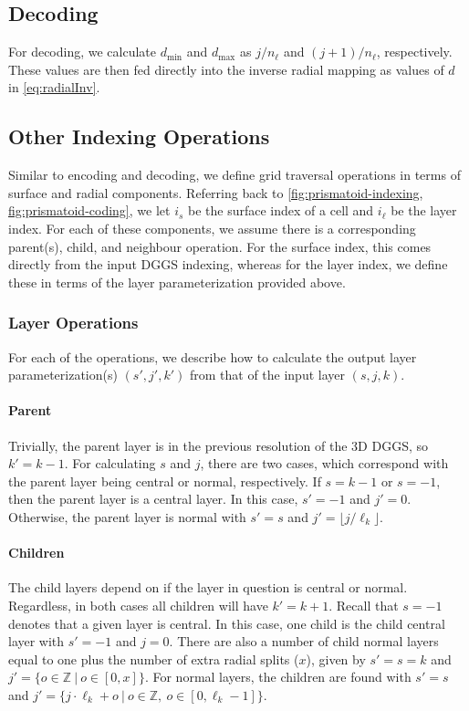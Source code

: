 \subsection{Decoding}
For decoding, we calculate $d_\mathrm{min}$ and $d_\mathrm{max}$ as $j/n_\ell$ and $(j+1)/n_\ell$, respectively.
These values are then fed directly into the inverse radial mapping as values of $d$ in \cref{eq:radialInv}.


\subsection{Other Indexing Operations}
Similar to encoding and decoding, we define grid traversal operations in terms of surface and radial components.
Referring back to \cref{fig:prismatoid-indexing, fig:prismatoid-coding}, we let $i_s$ be the surface index of a cell and $i_\ell$ be the layer index.
For each of these components, we assume there is a corresponding parent(s), child, and neighbour operation.
For the surface index, this comes directly from the input DGGS indexing, whereas for the layer index, we define these in terms of the layer parameterization provided above.


\subsubsection{Layer Operations}
For each of the operations, we describe how to calculate the output layer parameterization(s) $(s',j',k')$ from that of the input layer $(s,j,k)$.


\paragraph{Parent}
Trivially, the parent layer is in the previous resolution of the 3D DGGS, so $k' = k - 1$.
For calculating $s$ and $j$, there are two cases, which correspond with the parent layer being central or normal, respectively.
If $s = k-1$ or $s = -1$, then the parent layer is a central layer. In this case, $s' = -1$ and $j' = 0$.
Otherwise, the parent layer is normal with $s' = s$ and $j' = \lfloor j / \ell_k \rfloor$.


\paragraph{Children}
The child layers depend on if the layer in question is central or normal.
Regardless, in both cases all children will have $k' = k + 1$.
Recall that $s = -1$ denotes that a given layer is central.
In this case, one child is the child central layer with $s' = -1$ and $j = 0$.
There are also a number of child normal layers equal to one plus the number of extra radial splits ($x$), given by $s' = s = k$ and $j' = \{ o \in \mathbb{Z} \ | \ o \in [0, x] \}$.
For normal layers, the children are found with $s' = s$ and $j' = \{ j \cdot \ell_k + o \ | \  o \in \mathbb{Z}, \ o \in [0, \ell_k - 1] \}$.


